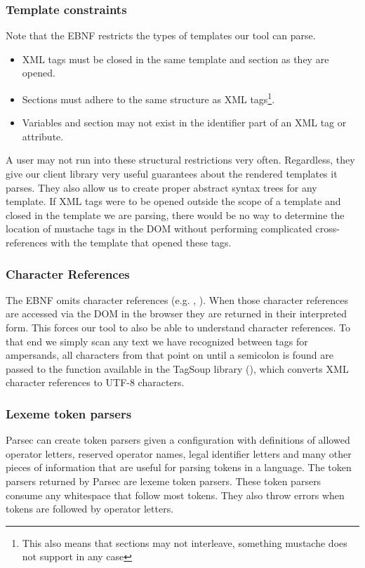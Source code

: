 \documentclass[thesis.tex]{subfiles}
\begin{document}
\subsubsection{Template constraints}
\label{sec:template-constraints}
Note that the EBNF restricts the types of
templates our tool can parse.

\begin{itemize}
\item XML tags must be closed in the same template and section as they are opened.
\item Sections must adhere to the same structure as XML tags\footnote{
      This also means that sections may not interleave, something mustache
      does not support in any case}.
\item Variables and section may not exist in the identifier part of an XML tag
      or attribute.
\end{itemize}

A user may not run into these structural restrictions very often. Regardless,
they give our client library very useful guarantees about the rendered templates
it parses. They also allow us to create proper abstract syntax trees for any
template.
If XML tags were to be opened outside the scope of a template
and closed in the template we are parsing, there would be no way to determine
the location of mustache tags in the DOM without performing complicated
cross-references with the template that opened these tags.

\subsubsection{Character References}
The EBNF omits character references (e.g. , ).
When those character references are accessed via the DOM in the browser they are
returned in their interpreted form. This forces our tool to also be able to
understand character references. To that end we simply scan any text we have
recognized between tags for ampersands, all characters from that point on until
a semicolon is found are passed to the  function available
in the TagSoup library (), which converts
XML character references to UTF-8 characters.

\subsubsection{Lexeme token parsers}
Parsec can create token parsers given a configuration with definitions of
allowed operator letters, reserved operator names,
legal identifier letters and many other pieces of information
that are useful for parsing tokens in a language.
The token parsers returned by Parsec are lexeme token parsers.
These token parsers consume any whitespace that follow most tokens.
They also throw errors when tokens are followed by operator letters.
\end{document}
